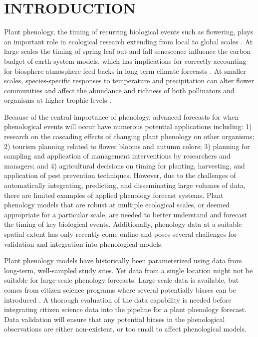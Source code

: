 \chapter{INTRODUCTION} \label{introduction}

Plant phenology, the timing of recurring biological events such as flowering, plays an important role in ecological research extending from local to global scales \citep{cleland2007, richardson2013, tang2016}. At large scales the timing of spring leaf out and fall senescence influence the carbon budget of earth system models, which has implications for correctly accounting for biosphere-atmosphere feed backs in long-term climate forecasts \citep{richardson2012}. At smaller scales, species-specific responses to temperature and precipitation can alter flower communities \citep{diez2012, caradonna2014, theobald2017} and affect the abundance and richness of both pollinators \citep{ogilvie2017a, ogilvie2017b} and organisms at higher trophic levels \citep{tylianakis2008}. 

Because of the central importance of phenology, advanced forecasts for when phenological events will occur have numerous potential applications including: 1) research on the cascading effects of changing plant phenology on other organisms; 2) tourism planning related to flower blooms and autumn colors; 3) planning for sampling and application of management interventions by researchers and managers; and 4) agricultural decisions on timing for planting, harvesting, and application of pest prevention techniques. However, due to the challenges of automatically integrating, predicting, and disseminating large volumes of data, there are limited examples of applied phenology forecast systems. Plant phenology models that are robust at multiple ecological scales, or deemed appropriate for a particular scale, are needed to better understand and forecast the timing of key biological events. Additionally, phenology data at a suitable spatial extent has only recently come online and poses several challenges for validation and integration into phenological models. 

Plant phenology models have historically been parameterized using data from long-term, well-sampled study sites. Yet data from a single location might not be suitable for large-scale phenology forecasts. Large-scale data is available, but comes from citizen science programs where several potentially biases can be introduced \citep{dickinson2010}. A thorough evaluation of the data capability is needed before integrating citizen science data into the pipeline for a plant phenology forecast. Data validation will ensure that any potential biases in the phenological observations are either non-existent, or too small to affect phenological models. 

